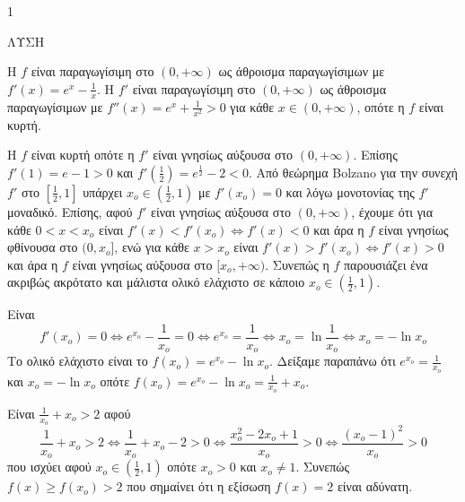 \begin{ylh}{1}
    \item [Ύλη από εικόνα]
\end{ylh}
ΛΥΣΗ
\begin{alist}
\item Η $f$ είναι παραγωγίσιμη στο $(0,+\infty)$ ως άθροισμα παραγωγίσιμων με $f'(x)=e^x - \frac{1}{x}$. Η $f'$ είναι παραγωγίσιμη στο $(0,+\infty)$ ως άθροισμα παραγωγίσιμων με $f''(x)=e^x + \frac{1}{x^2} > 0$ για κάθε $x \in (0,+\infty)$, οπότε η $f$ είναι κυρτή.
\item Η $f$ είναι κυρτή οπότε η $f'$ είναι γνησίως αύξουσα στο $(0,+\infty)$. Επίσης $f'(1)=e-1>0$ και $f'\left(\frac{1}{2}\right)=e^{\frac{1}{2}}-2<0$.
Από θεώρημα Bolzano για την συνεχή $f'$ στο $\left[\frac{1}{2},1\right]$ υπάρχει $x_o \in \left(\frac{1}{2},1\right)$ με $f'(x_o)=0$ και λόγω μονοτονίας της $f'$ μοναδικό.
Επίσης, αφού $f'$ είναι γνησίως αύξουσα στο $(0,+\infty)$, έχουμε ότι για κάθε $0<x<x_o$ είναι $f'(x)<f'(x_o) \Leftrightarrow f'(x)<0$ και άρα η $f$ είναι γνησίως φθίνουσα στο $(0,x_o]$, ενώ για κάθε $x>x_o$ είναι $f'(x)>f'(x_o) \Leftrightarrow f'(x)>0$ και άρα η $f$ είναι γνησίως αύξουσα στο $[x_o,+\infty)$. Συνεπώς η $f$ παρουσιάζει ένα ακριβώς ακρότατο και μάλιστα ολικό ελάχιστο σε κάποιο $x_o \in \left(\frac{1}{2},1\right)$.
\item Είναι
\[ f'(x_o)=0 \Leftrightarrow e^{x_o} - \frac{1}{x_o} = 0 \Leftrightarrow e^{x_o} = \frac{1}{x_o} \Leftrightarrow x_o = \ln \frac{1}{x_o} \Leftrightarrow x_o = -\ln x_o \]
Το ολικό ελάχιστο είναι το $f(x_o)=e^{x_o} - \ln x_o$. Δείξαμε παραπάνω ότι $e^{x_o} = \frac{1}{x_o}$ και $x_o = -\ln x_o$ οπότε $f(x_o)=e^{x_o} - \ln x_o = \frac{1}{x_o} + x_o$.
\item Είναι $\frac{1}{x_o}+x_o > 2$ αφού
\[ \frac{1}{x_o}+x_o > 2 \Leftrightarrow \frac{1}{x_o}+x_o - 2 > 0 \Leftrightarrow \frac{x_o^2 - 2x_o + 1}{x_o} > 0 \Leftrightarrow \frac{(x_o - 1)^2}{x_o} > 0 \]
που ισχύει αφού $x_o \in \left(\frac{1}{2},1\right)$ οπότε $x_o > 0$ και $x_o \neq 1$.
Συνεπώς $f(x) \geq f(x_o) > 2$ που σημαίνει ότι η εξίσωση $f(x)=2$ είναι αδύνατη.
\end{alist}